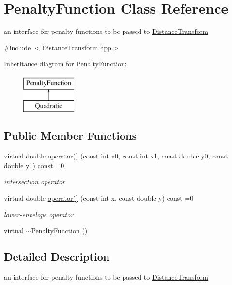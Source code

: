 \hypertarget{classPenaltyFunction}{\section{Penalty\-Function Class Reference}
\label{classPenaltyFunction}
}


an interface for penalty functions to be passed to \hyperlink{classDistanceTransform}{Distance\-Transform}  




{\ttfamily \#include $<$Distance\-Transform.\-hpp$>$}

Inheritance diagram for Penalty\-Function\-:\begin{figure}[H]
\begin{center}
\leavevmode
\includegraphics[height=2.000000cm]{classPenaltyFunction}
\end{center}
\end{figure}
\subsection*{Public Member Functions}
\begin{DoxyCompactItemize}
\item 
virtual double \hyperlink{classPenaltyFunction_a944230ce310515b1fe10972388c00042}{operator()} (const int x0, const int x1, const double y0, const double y1) const =0
\begin{DoxyCompactList}\small\item\em intersection operator \end{DoxyCompactList}\item 
virtual double \hyperlink{classPenaltyFunction_ad1f2cdbcfc85d0eaf3b734cafce60c48}{operator()} (const int x, const double y) const =0
\begin{DoxyCompactList}\small\item\em lower-\/envelope operator \end{DoxyCompactList}\item 
virtual \hyperlink{classPenaltyFunction_ac97741baf27aa9e506f430338f460498}{$\sim$\-Penalty\-Function} ()
\end{DoxyCompactItemize}


\subsection{Detailed Description}
an interface for penalty functions to be passed to \hyperlink{classDistanceTransform}{Distance\-Transform} 

